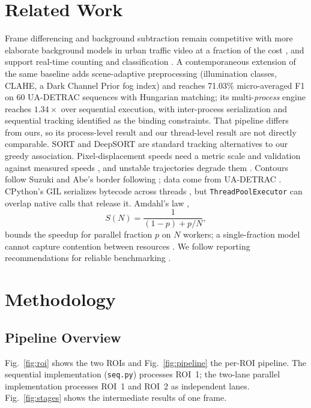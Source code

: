 \documentclass[conference]{IEEEtran}
\newcommand{\code}[1]{\texttt{#1}}
\begin{document}
\section{Related Work}
\label{sec:related}
Frame differencing and background subtraction remain competitive with
more elaborate background models in urban traffic video at a fraction of
the cost \cite{cheung2004}, and support real-time counting and
classification \cite{unzueta2012,crouzil2016}. A contemporaneous
extension of the same baseline \cite{muthuraja2026} adds scene-adaptive
preprocessing (illumination classes, CLAHE, a Dark Channel Prior fog
index) and reaches 71.03\% micro-averaged F1 on 60 UA-DETRAC sequences
with Hungarian matching; its multi-\emph{process} engine reaches
$1.34\times$ over sequential execution, with inter-process serialization
and sequential tracking identified as the binding constraints. That
pipeline differs from ours, so its process-level result and our
thread-level result are not directly comparable. SORT \cite{bewley2016} and DeepSORT \cite{wojke2017}
are standard tracking alternatives to our greedy association.
Pixel-displacement speeds need a metric scale and validation against
measured speeds \cite{kamil2024}, and unstable trajectories degrade them
\cite{sangsuwan2024}. Contours follow Suzuki and Abe's border following
\cite{suzuki1985}; data come from UA-DETRAC \cite{wen2020}. CPython's GIL
serializes bytecode across threads \cite{pythongil}, but
\code{ThreadPoolExecutor} \cite{pythonfutures} can overlap native calls
that release it. Amdahl's law \cite{amdahl1967,alhayanni2020},
\begin{equation}
S(N)=\frac{1}{(1-p)+p/N},
\label{eq:amdahl}
\end{equation}
bounds the speedup for parallel fraction $p$ on $N$ workers; a
single-fraction model cannot capture contention between resources
\cite{poolla2023}. We follow reporting recommendations for reliable
benchmarking \cite{beyer2019,kalibera2013}.

\section{Methodology}
\label{sec:method}

\subsection{Pipeline Overview}
Fig.~\ref{fig:roi} shows the two ROIs and Fig.~\ref{fig:pipeline} the
per-ROI pipeline. The sequential implementation (\code{seq.py})
processes ROI~1; the two-lane parallel implementation processes ROI~1 and
ROI~2 as independent lanes. Fig.~\ref{fig:stages}
shows the intermediate results of one frame.
\end{document}
